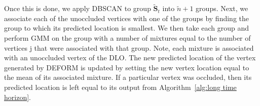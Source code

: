 Once this is done, we apply DBSCAN to group $\tilde{\textbf{S}}_t$ into $\tilde{n}+1$ groups. 
Next, we associate each of the unoccluded vertices with one of the groups by finding the group to which its predicted location is smallest. 
We then take each group and perform GMM on the group with a number of mixtures equal to the number of vertices j that were associated with that group. 
Note, each mixture is associated with an unoccluded vertex of the DLO.
The new predicted location of the vertex generated by DEFORM is updated by setting the new vertex location equal to the mean of its associated mixture. %
If a particular vertex was occluded, then its predicted location is left equal to its output from Algorithm~\ref{alg:long time horizon}.

